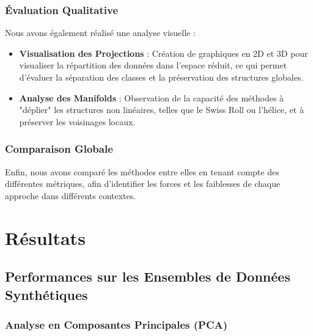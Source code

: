 \documentclass[unnumsec,webpdf,modern,large]{projet_manifold}%
\theoremstyle{thmstyleone}%
\theoremstyle{thmstyletwo}%
\theoremstyle{thmstylethree}%
\begin{document}
\subsubsection{Évaluation Qualitative}

Nous avons également réalisé une analyse visuelle :

\begin{itemize} \item \textbf{Visualisation des Projections} : Création de graphiques en 2D et 3D pour visualiser la répartition des données dans l'espace réduit, ce qui permet d'évaluer la séparation des classes et la préservation des structures globales. \item \textbf{Analyse des Manifolds} : Observation de la capacité des méthodes à "déplier" les structures non linéaires, telles que le Swiss Roll ou l'hélice, et à préserver les voisinages locaux. \end{itemize}

\subsubsection{Comparaison Globale}

Enfin, nous avons comparé les méthodes entre elles en tenant compte des différentes métriques, afin d'identifier les forces et les faiblesses de chaque approche dans différents contextes.




\section{Résultats}




\subsection{Performances sur les Ensembles de Données Synthétiques}

\subsubsection{Analyse en Composantes Principales (PCA)}
\end{document}
